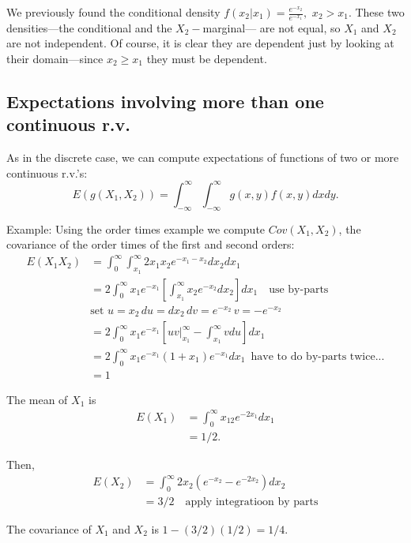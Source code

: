 \documentclass[
]{book}
\begin{document}
We previously found the conditional density \(f(x_2|x_1) = \frac{e^{-x_2}}{e^{-x_1}}, \,\,x_2>x_1\). These two densities---the conditional and the \(X_2-\)marginal--- are not equal, so \(X_1\) and \(X_2\) are not independent. Of course, it is clear they are dependent just by looking at their domain---since \(x_2\geq x_1\) they must be dependent.

\hypertarget{expectations-involving-more-than-one-continuous-r.v.}{%
\subsection{Expectations involving more than one continuous r.v.}\label{expectations-involving-more-than-one-continuous-r.v.}}

As in the discrete case, we can compute expectations of functions of two or more continuous r.v.'s:
\[E(g(X_1,X_2)) = \int_{-\infty}^\infty\int_{-\infty}^\infty g(x,y)f(x,y) dxdy.\]

Example: Using the order times example we compute \(Cov(X_1, X_2)\), the covariance of the order times of the first and second orders:
\begin{align*}
E(X_1X_2) &= \int_0^\infty \int_{x_1}^\infty 2x_1x_2e^{-x_1-x_2} dx_2 dx_1\\
& = 2\int_0^\infty x_1e^{-x_1} \left [\int_{x_1}^\infty x_2e^{-x_2}dx_2\right ] dx_1 \quad \text{use by-parts}\\
& \text{set }u=x_2\, du = dx_2\, dv = e^{-x_2}\, v = -e^{-x_2}\, \\
& = 2\int_0^\infty x_1e^{-x_1} \left [uv|_{x_1}^\infty - \int_{x_1}^\infty vdu \right] dx_1\\
& = 2\int_0^\infty x_1e^{-x_1}(1+x_1)e^{-x_1}dx_1 \, \text{ have to do by-parts twice...}\\
& = 1
\end{align*}

The mean of \(X_1\) is
\begin{align*}
E(X_1) &= \int_0^{\infty} x_12e^{-2x_1} dx_1\\
& = 1/2.
\end{align*}

Then,
\begin{align*}
E(X_2) &= \int_0^\infty 2x_2(e^{-x_2}-e^{-2x_2}) dx_2 \\
& = 3/2 \quad \text{apply integratioon by parts}
\end{align*}

The covariance of \(X_1\) and \(X_2\) is \(1 - (3/2)(1/2) =1/4\).
\end{document}
